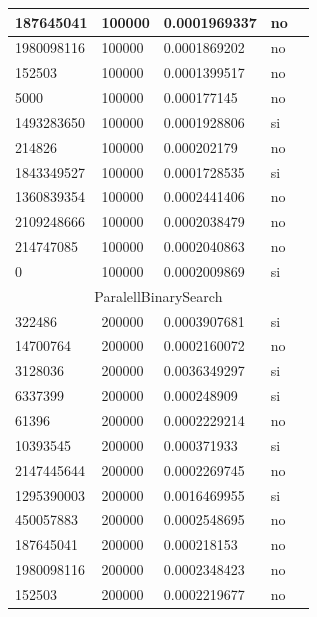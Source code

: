 \documentclass[12pt, fleqn]{article}                             %
\theoremstyle{break}                                            %
\begin{document}
\begin{longtable}{|m{5em}|m{5em}|m{10em}|m{5em}|@{}m{0pt}@{}}
            187645041& 100000  & 0.0001969337 & no &\\[1em]    \hline
            1980098116& 100000  & 0.0001869202 & no &\\[1em]    \hline
            152503& 100000  & 0.0001399517 & no &\\[1em]    \hline
            5000& 100000  & 0.000177145 & no &\\[1em]    \hline
            1493283650& 100000  & 0.0001928806 & si &\\[1em]    \hline
            214826& 100000  & 0.000202179 & no &\\[1em]    \hline
            1843349527& 100000  & 0.0001728535 & si &\\[1em]    \hline
            1360839354& 100000  & 0.0002441406 & no &\\[1em]    \hline
            2109248666& 100000  & 0.0002038479 & no &\\[1em]    \hline
            214747085& 100000  & 0.0002040863 & no &\\[1em]    \hline
            0& 100000  & 0.0002009869 & si &\\[1em]    \hline
            \multicolumn{5}{|c|}{ParalellBinarySearch}   \\          \hline
            322486& 200000  & 0.0003907681 & si &\\[1em]    \hline
            14700764& 200000  & 0.0002160072 & no &\\[1em]    \hline
            3128036& 200000  & 0.0036349297 & si &\\[1em]    \hline
            6337399& 200000  & 0.000248909 & si &\\[1em]    \hline
            61396& 200000  & 0.0002229214 & no &\\[1em]    \hline
            10393545& 200000  & 0.000371933 & si &\\[1em]    \hline
            2147445644& 200000  & 0.0002269745 & no &\\[1em]    \hline
            1295390003& 200000  & 0.0016469955 & si &\\[1em]    \hline
            450057883& 200000  & 0.0002548695 & no &\\[1em]    \hline
            187645041& 200000  & 0.000218153 & no &\\[1em]    \hline
            1980098116& 200000  & 0.0002348423 & no &\\[1em]    \hline
            152503& 200000  & 0.0002219677 & no &\\[1em]    \hline

\end{longtable}
\end{document}
